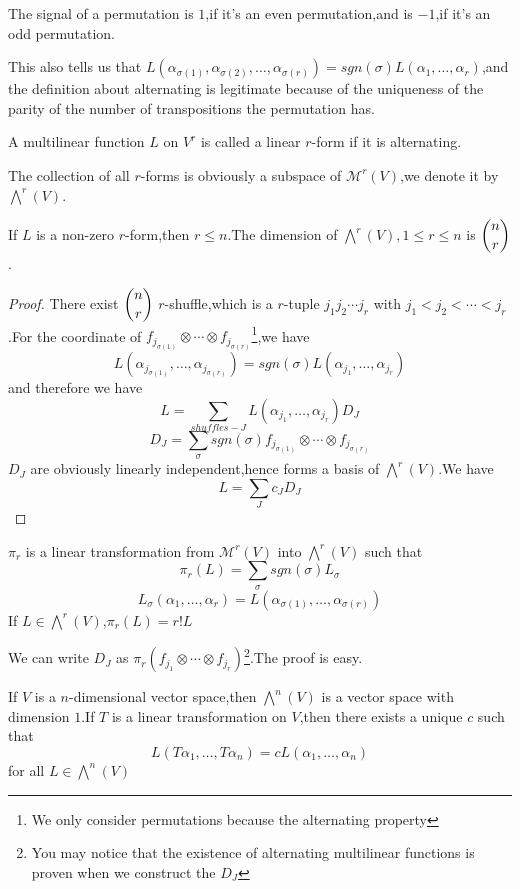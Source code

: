 \documentclass{article}
\begin{document}
\begin{dde}
	The signal of a permutation is $1$,if it's an even permutation,and is $-1$,if it's an odd permutation.
\end{dde}
This also tells us that $L(\alpha_{\sigma(1)},\alpha_{\sigma(2)},\dots,\alpha_{\sigma(r)})=sgn(\sigma)L(\alpha_1,\dots,\alpha_r)$,and the definition about alternating is legitimate because of the uniqueness of the parity of the number of transpositions the permutation has.\\
\begin{dde}
	A multilinear function $L$ on $V^r$ is called a linear $r$-form if it is alternating.
\end{dde}
The collection of all $r$-forms is obviously a subspace of $\mathcal{M}^r(V)$,we denote it by $\bigwedge^r(V)$.
\begin{thm}
	If $L$ is a non-zero $r$-form,then $r\le n$.The dimension of $\bigwedge^r(V),1\le r\le n$ is $\dbinom{n}{r}$.
\end{thm}
\begin{proof}
	There exist $\dbinom{n}{r}$ $r$-shuffle,which is a $r$-tuple $j_1j_2\cdots j_r$ with $j_1<j_2<\cdots<j_r$.For the coordinate of $f_{j_{\sigma(1)}}\otimes\cdots\otimes f_{j_{\sigma(r)}}$\footnote{We only consider permutations because the alternating property},we have
	\[L(\alpha_{j_{\sigma(1)}},\dots,\alpha_{j_{\sigma(r)}})=sgn(\sigma)L(\alpha_{j_1},\dots,\alpha_{j_r})\]
	and therefore we have
	\[L=\sum\limits_{shuffles-J}L(\alpha_{j_1},\dots,\alpha_{j_r})D_J\]
	\[D_J=\sum\limits_\sigma sgn(\sigma)f_{j_{\sigma(1)}}\otimes\cdots\otimes f_{j_{\sigma(r)}}\]
	$D_J$ are obviously linearly independent,hence forms a basis of $\bigwedge^r(V)$.We have
	\[L=\sum\limits_Jc_JD_J\]
\end{proof}
\begin{dde}
	$\pi_r$ is a linear transformation from $\mathcal{M}^r(V)$ into $\bigwedge^r(V)$ such that
	\[\pi_r(L)=\sum\limits_\sigma sgn(\sigma)L_\sigma\]
	\[L_\sigma(\alpha_1,\dots,\alpha_r)=L(\alpha_{\sigma(1)},\dots,\alpha_{\sigma(r)})\]
	If $L\in\bigwedge^r(V)$,$\pi_r(L)=r!L$
\end{dde}
We can write $D_J$ as $\pi_r(f_{j_1}\otimes\cdots\otimes f_{j_r})$\footnote{You may notice that the existence of alternating multilinear functions is proven when we construct the $D_J$}.The proof is easy.
\begin{coro}
	If $V$ is a $n$-dimensional vector space,then $\bigwedge^n(V)$ is a vector space with dimension $1$.If $T$ is a linear transformation on $V$,then there exists a unique $c$ such that
	\[L(T\alpha_1,\dots,T\alpha_n)=cL(\alpha_1,\dots,\alpha_n)\]
	for all $L\in\bigwedge^n(V)$
\end{coro}
\end{document}
